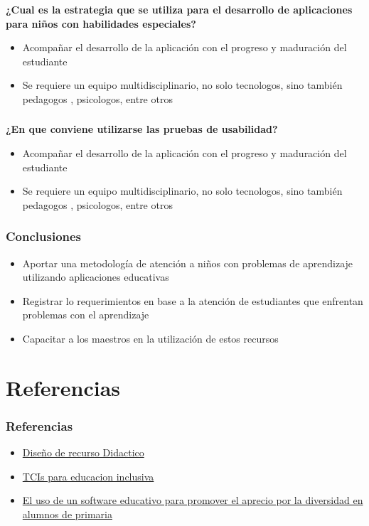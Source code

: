 \documentclass[11pt]{beamer}
\begin{document}
\begin{frame}

\frametitle{}
\textbf{¿Cual es la estrategia que se utiliza para el desarrollo de aplicaciones para niños con habilidades especiales?}
\begin{itemize}
\item Acompañar el desarrollo de la aplicación  con el progreso y maduración del estudiante
\item Se requiere un equipo multidisciplinario, no solo tecnologos, sino también pedagogos , psicologos, entre otros
\end{itemize}


\end{frame}

\begin{frame}
\frametitle{}

\textbf{¿En que conviene utilizarse las pruebas de usabilidad?}
\begin{itemize}
\item Acompañar el desarrollo de la aplicación  con el progreso y maduración del estudiante
\item Se requiere un equipo multidisciplinario, no solo tecnologos, sino también pedagogos , psicologos, entre otros
\end{itemize}


\end{frame}


\begin{frame}
    

\frametitle{Conclusiones}
\begin{itemize}
\item Aportar una metodología de atención a niños con problemas de aprendizaje utilizando aplicaciones educativas
\item Registrar lo requerimientos en base a la atención de estudiantes que enfrentan problemas con el aprendizaje
\item Capacitar a los maestros en la utilización de estos recursos
\end{itemize}

\end{frame}

\section{Referencias}
\begin{frame}
\frametitle{Referencias}
\begin{itemize}
\item  \href{https://recursos.portaleducoas.org/sites/default/files/VE14.061.pdf}{Diseño de recurso Didactico}
\item  \href{http://sedici.unlp.edu.ar/bitstream/handle/10915/31833/Documento_completo.pdf?sequence=1&isAllowed=yy}{TCIs para educacion inclusiva}
\item  \href{https://www.redalyc.org/pdf/688/68830444003.pdf}{El uso de un software educativo para promover el aprecio por la diversidad en alumnos de primaria}

\end{itemize}
\end{frame}
\end{document}
